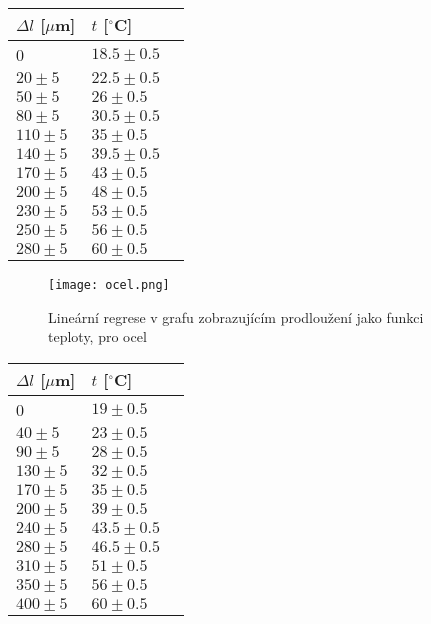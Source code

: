 \documentclass{article}
\begin{document}
\begin{center}
    \label{tab:title}
    \begin{tabular}{ | l | l  | p{4cm} |} \hline
    $\Delta l$ [$\mu$m] & $t$ [$^\circ$C] \\ \hline
    0 & $18.5\pm0.5$ \\ \hline
    $20\pm5$ & $22.5\pm0.5$ \\ \hline
    $50\pm5$ & $26\pm0.5$ \\ \hline
    $80\pm5$ & $30.5\pm0.5$ \\ \hline
    $110\pm5$ & $35\pm0.5$ \\ \hline
    $140\pm5$ & $39.5\pm0.5$ \\ \hline
    $170\pm5$ & $43\pm0.5$ \\ \hline
    $200\pm5$ & $48\pm0.5$ \\ \hline
    $230\pm5$ & $53\pm0.5$ \\ \hline
    $250\pm5$ & $56\pm0.5$ \\ \hline
    $280\pm5$ & $60\pm0.5$ \\ \hline
    \end{tabular}
\end{center}
\begin{figure}[H]
\centering
\texttt{[image: ocel.png]}
\caption{Lineární regrese v grafu zobrazujícím prodloužení jako funkci teploty, pro ocel}
\end{figure}
\begin{center}
    \label{tab:title}
    \begin{tabular}{ | l | l  | p{4cm} |} \hline
    $\Delta l$ [$\mu$m] & $t$ [$^\circ$C] \\ \hline
    0 & $19\pm0.5$ \\ \hline
    $40\pm5$ & $23\pm0.5$ \\ \hline
    $90\pm5$ & $28\pm0.5$ \\ \hline
    $130\pm5$ & $32\pm0.5$ \\ \hline
    $170\pm5$ & $35\pm0.5$ \\ \hline
    $200\pm5$ & $39\pm0.5$ \\ \hline
    $240\pm5$ & $43.5\pm0.5$ \\ \hline
    $280\pm5$ & $46.5\pm0.5$ \\ \hline
    $310\pm5$ & $51\pm0.5$ \\ \hline
    $350\pm5$ & $56\pm0.5$ \\ \hline
    $400\pm5$ & $60\pm0.5$ \\ \hline
    \end{tabular}
\end{center}
\end{document}
